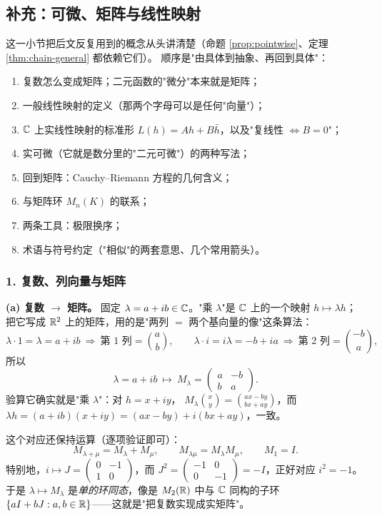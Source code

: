 \subsection{补充：可微、矩阵与线性映射}

这一小节把后文反复用到的概念从头讲清楚（命题 \ref{prop:pointwise}、定理 \ref{thm:chain-general} 都依赖它们）。
顺序是"由具体到抽象、再回到具体"：

\begin{enumerate}[label=\arabic*., leftmargin=1.9em]
\item 复数怎么变成矩阵；二元函数的"微分"本来就是矩阵；
\item 一般线性映射的定义（那两个字母可以是任何"向量"）；
\item $\mathbb{C}$ 上实线性映射的标准形 $L(h)=Ah+B\bar h$，以及"复线性 $\iff B=0$"；
\item 实可微（它就是数分里的"二元可微"）的两种写法；
\item 回到矩阵：Cauchy--Riemann 方程的几何含义；
\item 与矩阵环 $M_n(K)$ 的联系；
\item 两条工具：极限换序；
\item 术语与符号约定（"相似"的两套意思、几个常用箭头）。
\end{enumerate}

\subsubsection*{1. 复数、列向量与矩阵}

\noindent\textbf{(a) 复数 $\to$ 矩阵。}
固定 $\lambda=a+ib\in\mathbb{C}$。"乘 $\lambda$"是 $\mathbb{C}$ 上的一个映射 $h\mapsto\lambda h$；
把它写成 $\mathbb{R}^2$ 上的矩阵，用的是"两列 $=$ 两个基向量的像"这条算法：
\[
\lambda\cdot 1=\lambda=a+ib\ \Longrightarrow\ \text{第 1 列}=\binom{a}{b},
\qquad
\lambda\cdot i=i\lambda=-b+ia\ \Longrightarrow\ \text{第 2 列}=\binom{-b}{a},
\]
所以
\[
\lambda=a+ib\ \longmapsto\ M_\lambda=\begin{pmatrix} a & -b\\ b & a\end{pmatrix}.
\]
验算它确实就是"乘 $\lambda$"：对 $h=x+iy$，
$M_\lambda\binom{x}{y}=\binom{ax-by}{bx+ay}$，而 $\lambda h=(a+ib)(x+iy)=(ax-by)+i(bx+ay)$，一致。

这个对应还保持运算（逐项验证即可）：
\[
M_{\lambda+\mu}=M_\lambda+M_\mu,\qquad
M_{\lambda\mu}=M_\lambda M_\mu,\qquad
M_1=I .
\]
特别地，$i\longmapsto J=\begin{pmatrix}0&-1\\ 1&0\end{pmatrix}$，而
$J^2=\begin{pmatrix}-1&0\\ 0&-1\end{pmatrix}=-I$，正好对应 $i^2=-1$。
于是 $\lambda\mapsto M_\lambda$ 是\emph{单的环同态}，像是 $M_2(\mathbb{R})$ 中与 $\mathbb{C}$ 同构的子环
$\{aI+bJ:a,b\in\mathbb{R}\}$——这就是"把复数实现成实矩阵"。

